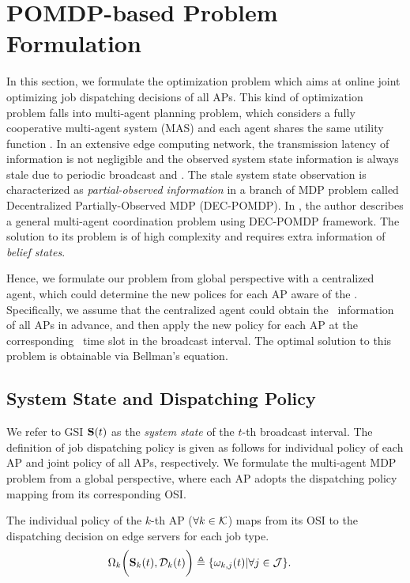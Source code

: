 \section{POMDP-based Problem Formulation}
In this section, we formulate the optimization problem which aims at online joint optimizing job dispatching decisions of all APs.
This kind of optimization problem falls into multi-agent planning problem, which considers a fully cooperative multi-agent system (MAS) and each agent shares the same utility function \cite{IJCAI99-BoutilierC}.
In an extensive edge computing network, the transmission latency of information is not negligible and the observed system state information is always stale due to periodic broadcast and \brlatency.
The stale system state observation is characterized as \emph{partial-observed information} in a branch of MDP problem called Decentralized Partially-Observed MDP (DEC-POMDP).
In \cite{IJCAI03-NairR}, the author describes a general multi-agent coordination problem using DEC-POMDP framework. The solution to its problem is of high complexity and requires extra information of \emph{belief states}.

Hence, we formulate our problem from global perspective with a centralized agent, which could determine the new polices for each AP aware of the \brlatency.
Specifically, we assume that the centralized agent could obtain the \brlatency~information of all APs in advance, and then apply the new policy for each AP at the corresponding \brlatency~time slot in the broadcast interval.
The optimal solution to this problem is obtainable via Bellman's equation.

\subsection{System State and Dispatching Policy}
We refer to GSI $\mathbf{S}(t)$ as the \emph{system state} of the $t$-th broadcast interval.
The definition of job dispatching policy is given as follows for individual policy of each AP and joint policy of all APs, respectively.
We formulate the multi-agent MDP problem from a global perspective, where each AP adopts the dispatching policy mapping from its corresponding OSI.
\begin{definition}
    The individual policy of the $k$-th AP ($\forall k \in\mathcal{K}$) maps from its OSI to the dispatching decision on edge servers for each job type.
    \begin{align}
        &\Omega_{k} \bigg( \mathbf{S}_{k}(t), \mathcal{D}_{k}(t) \bigg)
        \triangleq \{\omega_{k,j}(t)|\forall j\in\mathcal{J}\}.
        \label{def:action}
    \end{align}
\end{definition}

